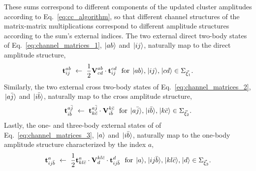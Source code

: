 \documentclass[thesis.tex]{subfiles}
\begin{document}
These sums correspond to different components of the updated cluster amplitudes according to Eq.\ \eqref{eq:cc_algorithm}, so that different channel structures of the matrix-matrix multiplications correspond to different amplitude structures according to the sum's external indices.  The two external direct two-body states of Eq.\ \eqref{eq:channel_matrices_1}, $\hspace{1pt}\lvert ab \rangle$ and $\hspace{1pt}\lvert ij \rangle$, naturally map to the direct amplitude structure,
\begin{equation} \label{eq:amp_matrices_1}
  \btamp{ab}{ij}\ \leftarrow\ \frac{1}{2}\bvint{ab}{cd}\cdot\btamp{cd}{ij}\ \ \text{for}\ \ket{ab},\ket{ij},\ket{cd} \in \Sigma_{\vec{\xi}_{1}}.
\end{equation}
Similarly, the two external cross two-body states of Eq.\ \eqref{eq:channel_matrices_2}, $\hspace{1pt}\lvert a\bar{j} \rangle$ and $\hspace{1pt}\lvert i\bar{b} \rangle$, naturally map to the cross amplitude structure,
\begin{equation} \label{eq:amp_matrices_2}
  \btamp{a\bar{j}}{i\bar{b}}\ \leftarrow\ \btamp{a\bar{j}}{k\bar{c}}\cdot\bvint{k\bar{c}}{i\bar{b}}\ \ \text{for}\ \ket{a\bar{j}},\ket{i\bar{b}},\ket{k\bar{c}} \in \Sigma_{\vec{\xi}_{2}}.
\end{equation}
Lastly, the one- and three-body external states of of Eq.\ \eqref{eq:channel_matrices_3}, $\hspace{1pt}\lvert a \rangle$ and $\hspace{1pt}\lvert i\bar{b} \rangle$, naturally map to the one-body amplitude structure characterized by the index $a$,
\begin{equation} \label{eq:amp_matrices_3}
  \btamp{a}{ij\bar{b}}\ \leftarrow\ \frac{1}{2}\btamp{a}{kl\bar{c}}\cdot\bvint{kl\bar{c}}{d}\cdot\btamp{d}{ij\bar{b}}\ \ \text{for}\ \ket{a},\ket{ij\bar{b}},\ket{kl\bar{c}},\ket{d} \in \Sigma_{\vec{\xi}_{3}}.
\end{equation}
\end{document}
